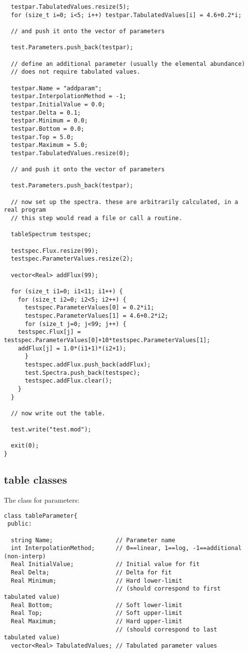 \documentclass[11pt]{book}
\begin{document}
\begin{verbatim}
  testpar.TabulatedValues.resize(5);
  for (size_t i=0; i<5; i++) testpar.TabulatedValues[i] = 4.6+0.2*i;

  // and push it onto the vector of parameters

  test.Parameters.push_back(testpar);

  // define an additional parameter (usually the elemental abundance)
  // does not require tabulated values.

  testpar.Name = "addparam";
  testpar.InterpolationMethod = -1;
  testpar.InitialValue = 0.0;
  testpar.Delta = 0.1;
  testpar.Minimum = 0.0;
  testpar.Bottom = 0.0;
  testpar.Top = 5.0;
  testpar.Maximum = 5.0;
  testpar.TabulatedValues.resize(0);

  // and push it onto the vector of parameters

  test.Parameters.push_back(testpar);

  // now set up the spectra. these are arbitrarily calculated, in a real program 
  // this step would read a file or call a routine.

  tableSpectrum testspec;

  testspec.Flux.resize(99);
  testspec.ParameterValues.resize(2);

  vector<Real> addFlux(99);

  for (size_t i1=0; i1<11; i1++) {
    for (size_t i2=0; i2<5; i2++) {
      testspec.ParameterValues[0] = 0.2*i1;
      testspec.ParameterValues[1] = 4.6+0.2*i2;
      for (size_t j=0; j<99; j++) {
	testspec.Flux[j] = testspec.ParameterValues[0]+10*testspec.ParameterValues[1];
	addFlux[j] = 1.0*(i1+1)*(i2+1);
      }
      testspec.addFlux.push_back(addFlux);
      test.Spectra.push_back(testspec);
      testspec.addFlux.clear();
    }
  }

  // now write out the table.

  test.write("test.mod");

  exit(0);
}
\end{verbatim}


\subsection{table classes}

The class for parameters:

\begin{verbatim}
class tableParameter{
 public:

  string Name;                  // Parameter name
  int InterpolationMethod;      // 0==linear, 1==log, -1==additional (non-interp)
  Real InitialValue;            // Initial value for fit
  Real Delta;                   // Delta for fit
  Real Minimum;                 // Hard lower-limit 
                                // (should correspond to first tabulated value)
  Real Bottom;                  // Soft lower-limit
  Real Top;                     // Soft upper-limit
  Real Maximum;                 // Hard upper-limit 
                                // (should correspond to last tabulated value)
  vector<Real> TabulatedValues; // Tabulated parameter values
\end{verbatim}
\end{document}
